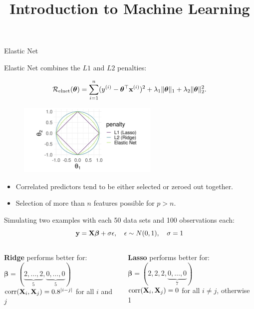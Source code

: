 \documentclass[11pt,compress,t,notes=noshow, xcolor=table]{beamer}
\title{Introduction to Machine Learning}
\date{}
\begin{document}




\begin{vbframe} {Elastic Net}


Elastic Net combines the $L1$ and $L2$ penalties:

$$
\mathcal{R}_{\text{elnet}}(\bm{\theta}) =  \sum\limits_{i=1}^n (y^{(i)} - \bm{\theta}^\top \mathbf{x}^{(i)})^2 + \lambda_1 \|\bm{\theta}\|_1 + \lambda_2 \|\bm{\theta}\|_2^2.
$$

\begin{figure}
\includegraphics[width=0.6\textwidth]{figure/lasso_ridge_enet_2d.png}\\
\end{figure}


\begin{itemize}
\item Correlated predictors tend to be either selected or zeroed out together.
\item Selection of more than $n$ features possible for $p>n$.
\end{itemize}


\framebreak
\footnotesize
Simulating two examples with each 50 data sets and 100 observations each: \\


$$\mathbf{y} =\mathbf{X} \boldsymbol{\beta}+\sigma \epsilon, \quad \epsilon \sim N(0,1), \quad \sigma = 1$$
  
  \begin{columns}
\begin{column}{0.5\textwidth}
\begin{center}
\textbf{Ridge} performs better for: \\ 
$\boldsymbol{\beta}=(\underbrace{2,\ldots,2}_{5},\underbrace{0,\ldots,0}_{5})$\\
$ \operatorname{corr}(\mathbf{X}_{i},\mathbf{X}_{j})=0.8^{|i-j|}$ for all $i$ and $j$
  \end{center}
\end{column}
\begin{column}{0.5\textwidth} 
\begin{center}
\textbf{Lasso} performs better for: \\
$\boldsymbol{\beta}=(2, 2, 2,\underbrace{0,\ldots,0}_{7})$ \\
$\operatorname{corr}(\mathbf{X}_{i},\mathbf{X}_{j})= 0$ for all $i \neq j$, otherwise 1
\end{center}
\end{column}
\end{columns}


\end{vbframe}
\end{document}
